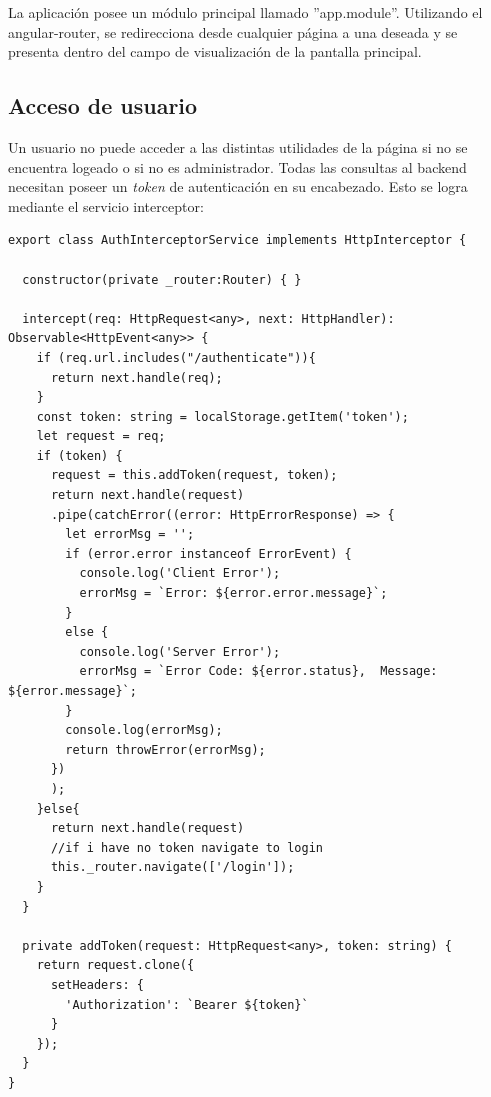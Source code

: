 La aplicación posee un módulo principal llamado ''app.module''. Utilizando el angular-router, se redirecciona desde cualquier página a una deseada y se presenta dentro del campo de visualización de la pantalla principal. 



\subsection{Acceso de usuario}

Un usuario no puede acceder a las distintas utilidades de la página si no se encuentra logeado o si no es administrador. Todas las consultas al backend necesitan poseer un \textit{token} de autenticación en su encabezado. Esto se logra mediante el servicio interceptor:


\begin{lstlisting}[label=cod:Inserción Token,caption=  Inserción de token]
export class AuthInterceptorService implements HttpInterceptor {

  constructor(private _router:Router) { }

  intercept(req: HttpRequest<any>, next: HttpHandler): Observable<HttpEvent<any>> {
    if (req.url.includes("/authenticate")){
      return next.handle(req);
    }
    const token: string = localStorage.getItem('token');
    let request = req;
	if (token) {
      request = this.addToken(request, token);
      return next.handle(request)
      .pipe(catchError((error: HttpErrorResponse) => {
        let errorMsg = '';
        if (error.error instanceof ErrorEvent) {
          console.log('Client Error');
          errorMsg = `Error: ${error.error.message}`;
        }
        else {
          console.log('Server Error');
          errorMsg = `Error Code: ${error.status},  Message: ${error.message}`;
        }
        console.log(errorMsg);
        return throwError(errorMsg);
      })
      );
    }else{
      return next.handle(request)
      //if i have no token navigate to login
      this._router.navigate(['/login']);
    }    
  }

  private addToken(request: HttpRequest<any>, token: string) {
    return request.clone({
      setHeaders: {
        'Authorization': `Bearer ${token}`
      }
    });
  }
}

\end{lstlisting}

